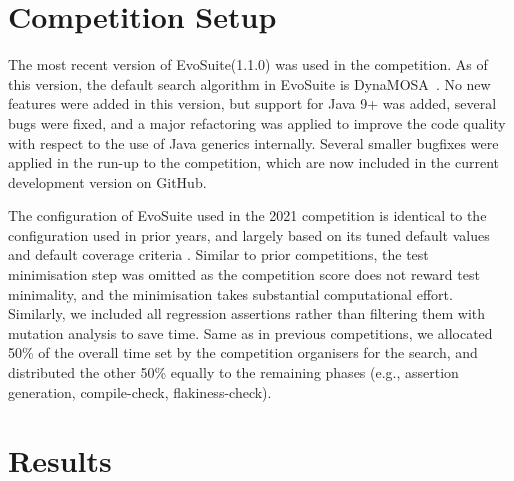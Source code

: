 \documentclass[10pt,conference]{IEEEtran}
\newcommand{\EVOSUITE}{{\sc EvoSuite}\xspace}
\begin{document}





\section{Competition Setup}


The most recent version of \EVOSUITE (1.1.0) was used in the competition. As of
this version, the default search algorithm in \EVOSUITE is
DynaMOSA~\cite{dynamosa}. No new features were added in this version, but
support for Java 9+ was added, several bugs were fixed, and a major refactoring
was applied to improve the code quality with respect to the use of Java
generics internally. Several smaller bugfixes were applied in the run-up to the
competition, which are now included in the current development version on
GitHub.

The configuration of \EVOSUITE used in the 2021 competition is identical to the
configuration used in prior years, and largely based on its tuned default
values~\cite{arcuri2013parameter} and default coverage criteria
\cite{rojas2015combining}.
%
Similar to prior competitions, the test minimisation step was omitted as the competition score does not reward test minimality, and the minimisation takes substantial computational effort. Similarly, we included all regression assertions rather than filtering them with mutation analysis to save time. 
%
Same as in previous competitions, we allocated 50\% of
the overall time set by the competition organisers for the search, and
distributed the other 50\% equally to the remaining phases (e.g., assertion generation, compile-check, flakiness-check).



\section{Results}
\end{document}
